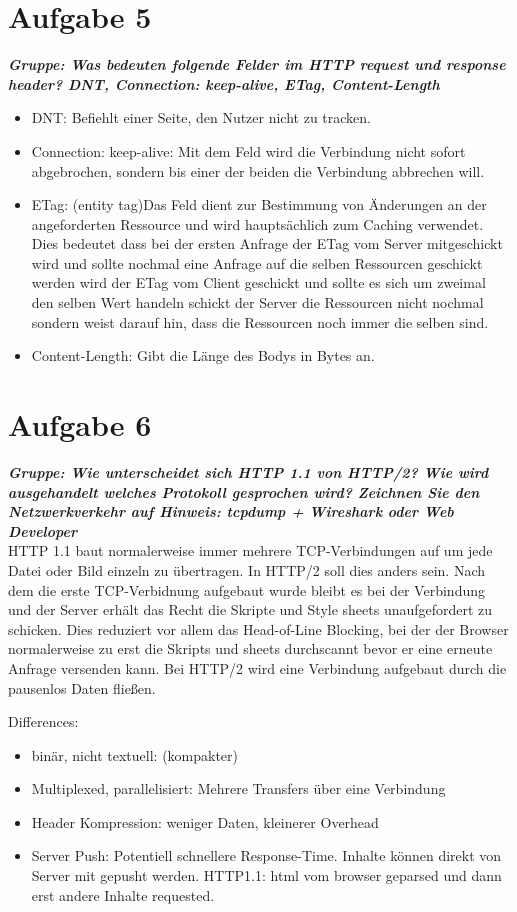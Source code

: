 \documentclass[12pt, a4paper]{report}
\begin{document}
\section*{Aufgabe 5}
\textbf{\textit{Gruppe: Was bedeuten folgende Felder im HTTP request und response header? DNT,
Connection: keep-alive, ETag, Content-Length}}
\begin{itemize}
	\item DNT: Befiehlt einer Seite, den Nutzer nicht zu tracken.
	\item Connection: keep-alive: Mit dem Feld wird die Verbindung nicht sofort abgebrochen, sondern bis einer der beiden die Verbindung abbrechen will.
	\item ETag: (entity tag)Das Feld dient zur Bestimmung von Änderungen an der angeforderten Ressource und wird hauptsächlich zum Caching verwendet. Dies bedeutet dass bei der ersten Anfrage der ETag vom Server mitgeschickt wird und sollte nochmal eine Anfrage auf die selben Ressourcen geschickt werden wird der ETag vom Client geschickt und sollte es sich um zweimal den selben Wert handeln schickt der Server die Ressourcen nicht nochmal sondern weist darauf hin, dass die Ressourcen noch immer die selben sind.
	\item Content-Length: Gibt die Länge des Bodys in Bytes an.
\end{itemize}

\section*{Aufgabe 6}
\textbf{\textit{Gruppe: Wie unterscheidet sich HTTP 1.1 von HTTP/2? Wie wird ausgehandelt welches
Protokoll gesprochen wird? Zeichnen Sie den Netzwerkverkehr auf Hinweis: tcpdump +
Wireshark oder Web Developer}}\\
HTTP 1.1 baut normalerweise immer mehrere TCP-Verbindungen auf um jede Datei oder Bild einzeln zu übertragen. In HTTP/2 soll dies anders sein. Nach dem die erste TCP-Verbidnung aufgebaut wurde bleibt es bei der Verbindung und der Server erhält das Recht die Skripte und Style sheets unaufgefordert zu schicken. Dies reduziert vor allem das Head-of-Line Blocking, bei der der Browser normalerweise zu erst die Skripts und sheets durchscannt bevor er eine erneute Anfrage versenden kann. Bei HTTP/2 wird eine Verbindung aufgebaut durch die pausenlos Daten flie\ss en.

Differences:
\begin{itemize}
	\item binär, nicht textuell: (kompakter)
	\item Multiplexed, parallelisiert: Mehrere Transfers über eine Verbindung
	\item Header Kompression: weniger Daten, kleinerer Overhead
	\item Server Push: Potentiell schnellere Response-Time. Inhalte können direkt von Server
	mit gepusht werden. HTTP1.1: html vom browser geparsed und dann erst andere Inhalte requested.
\end{itemize}
\end{document}
